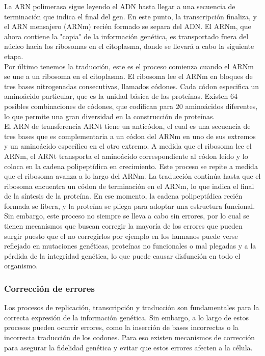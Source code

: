 La ARN polimerasa sigue leyendo el ADN hasta llegar a una secuencia de terminación que indica el final del gen. En este punto, la transcripción finaliza, y el ARN mensajero (ARNm) recién formado se separa del ADN. El ARNm, que ahora contiene la "copia" de la información genética, es transportado fuera del núcleo hacia los ribosomas en el citoplasma, donde se llevará a cabo la siguiente etapa.\\

Por último tenemos la traducción, este es el proceso  comienza cuando el ARNm se une a un ribosoma en el citoplasma. El ribosoma lee el ARNm en bloques de tres bases nitrogenadas consecutivas, llamados códones. Cada códon especifica un aminoácido particular, que es la unidad básica de las proteínas. Existen 64 posibles combinaciones de códones, que codifican para 20 aminoácidos diferentes, lo que permite una gran diversidad en la construcción de proteínas.\\

El ARN de transferencia ARNt  tiene un anticódon, el cual es una secuencia de tres bases que es complementaria a un códon del ARNm en uno de sus extremos y un aminoácido específico en el otro extremo. A medida que el ribosoma lee el ARNm, el ARNt transporta el aminoácido correspondiente al códon leído y lo coloca en la cadena polipeptídica en crecimiento. Este proceso se repite a medida que el ribosoma avanza a lo largo del ARNm. La traducción continúa hasta que el ribosoma encuentra un códon de terminación en el ARNm, lo que indica el final de la síntesis de la proteína. En ese momento, la cadena polipeptídica recién formada se libera, y la proteína se pliega para adoptar una estructura funcional.\\

Sin embargo, este proceso no siempre se lleva a cabo sin errores, por lo cual se tienen mecanismos que buscan corregir la mayoría de los errores que pueden surgir puesto que el no corregirlos por ejemplo en los humanos puede verse reflejado en mutaciones genéticas, proteínas no funcionales o mal plegadas y a la pérdida de la integridad genética, lo que puede causar disfunción en todo el organismo.\\

\subsubsection{Corrección de errores}


Los procesos de replicación, transcripción y traducción son fundamentales para la correcta expresión de la información genética. Sin embargo, a lo largo de estos procesos pueden ocurrir errores, como la inserción de bases incorrectas o la incorrecta traducción de los codones. Para eso existen mecanismos de corrección para asegurar la fidelidad genética y evitar que estos errores afecten a la célula.\\


